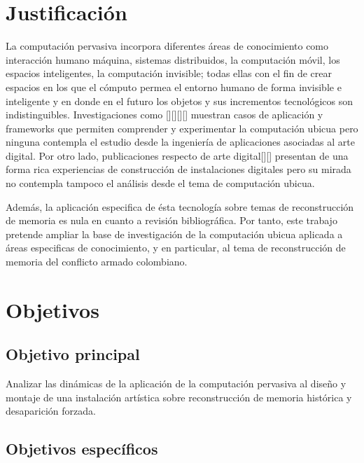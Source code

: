 \section{Justificación}

La computación pervasiva incorpora diferentes áreas de conocimiento como interacción humano máquina, sistemas distribuidos, la computación móvil, los espacios inteligentes, la computación invisible; todas ellas con el fin de crear espacios en los que el cómputo permea el entorno humano de forma invisible e inteligente y en donde en el futuro los objetos y sus incrementos tecnológicos son indistinguibles. Investigaciones como [][][][] muestran casos de aplicación y frameworks que permiten comprender y experimentar la computación ubicua pero ninguna contempla el estudio desde la ingeniería de aplicaciones asociadas al arte digital. Por otro lado, publicaciones respecto de arte digital[][] presentan de una forma rica experiencias de construcción de instalaciones digitales pero su mirada no contempla tampoco el análisis desde el tema de computación ubicua. 

Además, la aplicación especifica de ésta tecnología sobre temas de reconstrucción de memoria es nula en cuanto a revisión bibliográfica. Por tanto, este trabajo pretende ampliar la base de investigación de la computación ubicua aplicada a áreas especificas de conocimiento, y en particular, al tema de reconstrucción de memoria del conflicto armado colombiano.   

\section{Objetivos}

\subsection{Objetivo principal}

Analizar las dinámicas de la aplicación de la computación pervasiva al diseño y montaje de una instalación artística sobre reconstrucción de memoria histórica y desaparición forzada.

\subsection{Objetivos específicos}

